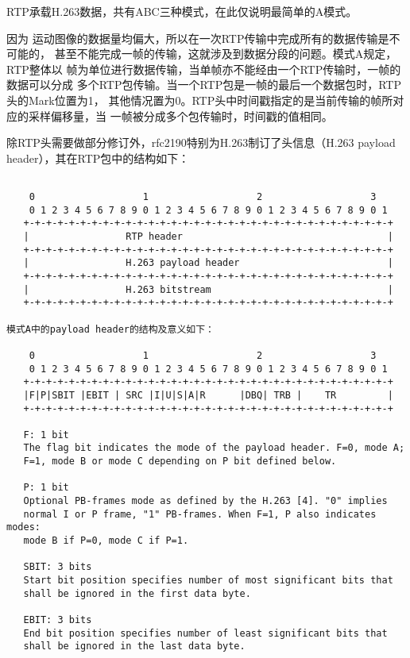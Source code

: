\documentclass[11pt]{article}
\begin{document}
    RTP承载H.263数据，共有ABC三种模式，在此仅说明最简单的A模式。
    
    因为
运动图像的数据量均偏大，所以在一次RTP传输中完成所有的数据传输是不可能的，
甚至不能完成一帧的传输，这就涉及到数据分段的问题。模式A规定，RTP整体以
帧为单位进行数据传输，当单帧亦不能经由一个RTP传输时，一帧的数据可以分成
多个RTP包传输。当一个RTP包是一帧的最后一个数据包时，RTP头的Mark位置为1，
其他情况置为0。RTP头中时间戳指定的是当前传输的帧所对应的采样偏移量，当
一帧被分成多个包传输时，时间戳的值相同。

除RTP头需要做部分修订外，rfc2190特别为H.263制订了头信息（H.263 payload 
header），其在RTP包中的结构如下：

{  \small
\begin{verbatim}

    0                   1                   2                   3
    0 1 2 3 4 5 6 7 8 9 0 1 2 3 4 5 6 7 8 9 0 1 2 3 4 5 6 7 8 9 0 1
   +-+-+-+-+-+-+-+-+-+-+-+-+-+-+-+-+-+-+-+-+-+-+-+-+-+-+-+-+-+-+-+-+
   |                 RTP header                                    |
   +-+-+-+-+-+-+-+-+-+-+-+-+-+-+-+-+-+-+-+-+-+-+-+-+-+-+-+-+-+-+-+-+
   |                 H.263 payload header                          |
   +-+-+-+-+-+-+-+-+-+-+-+-+-+-+-+-+-+-+-+-+-+-+-+-+-+-+-+-+-+-+-+-+
   |                 H.263 bitstream                               |
   +-+-+-+-+-+-+-+-+-+-+-+-+-+-+-+-+-+-+-+-+-+-+-+-+-+-+-+-+-+-+-+-+

模式A中的payload header的结构及意义如下：

    0                   1                   2                   3
    0 1 2 3 4 5 6 7 8 9 0 1 2 3 4 5 6 7 8 9 0 1 2 3 4 5 6 7 8 9 0 1
   +-+-+-+-+-+-+-+-+-+-+-+-+-+-+-+-+-+-+-+-+-+-+-+-+-+-+-+-+-+-+-+-+
   |F|P|SBIT |EBIT | SRC |I|U|S|A|R      |DBQ| TRB |    TR         |
   +-+-+-+-+-+-+-+-+-+-+-+-+-+-+-+-+-+-+-+-+-+-+-+-+-+-+-+-+-+-+-+-+

   F: 1 bit
   The flag bit indicates the mode of the payload header. F=0, mode A;
   F=1, mode B or mode C depending on P bit defined below.

   P: 1 bit
   Optional PB-frames mode as defined by the H.263 [4]. "0" implies
   normal I or P frame, "1" PB-frames. When F=1, P also indicates modes:
   mode B if P=0, mode C if P=1.

   SBIT: 3 bits
   Start bit position specifies number of most significant bits that
   shall be ignored in the first data byte.

   EBIT: 3 bits
   End bit position specifies number of least significant bits that
   shall be ignored in the last data byte.


\end{verbatim}}
\end{document}
